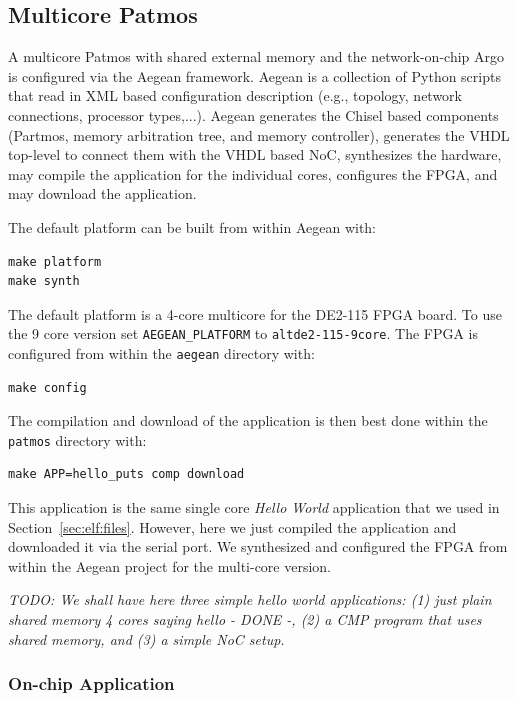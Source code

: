 \documentclass[a4paper,fontsize=10pt,twoside,DIV15,BCOR12mm,headinclude=true,footinclude=false,pagesize,bibtotoc]{scrbook}
\newcommand{\code}[1]{{\texttt{#1}}}
\newcommand{\todo}[1]{{\emph{TODO: #1}}}
\begin{document}
\subsection{Multicore Patmos}

A multicore Patmos with shared external memory and the network-on-chip Argo is configured via
the Aegean framework. Aegean is a collection of Python scripts that read in XML based configuration
description (e.g., topology, network connections, processor types,...). Aegean generates the Chisel based
components (Partmos, memory arbitration tree, and memory controller), generates the VHDL top-level
to connect them with the VHDL based NoC, synthesizes the hardware, may compile the application for the
individual cores, configures the FPGA, and may download the application.

The default platform can be built from within Aegean with:

\begin{verbatim}
make platform
make synth
\end{verbatim}

The default platform is a 4-core multicore for the DE2-115 FPGA board.
To use the 9 core version set \code{AEGEAN\_PLATFORM} to \code{altde2-115-9core}.
The FPGA is configured from within the \code{aegean} directory with:

\begin{verbatim}
make config
\end{verbatim}

The compilation and download of the application is then best done within
the \code{patmos} directory with:

\begin{verbatim}
make APP=hello_puts comp download
\end{verbatim}

This application is the same single core \emph{Hello World} application that
we used in Section~\ref{sec:elf:files}. However, here we just compiled the
application and downloaded it via the serial port. We synthesized and configured
the FPGA from within the Aegean project for the multi-core version.

\todo{We shall have here three simple hello world applications: (1) just plain shared memory 4 cores saying hello - DONE -,
(2) a CMP program that uses shared memory, and (3) a simple NoC setup.}

\subsubsection{On-chip Application}
\end{document}
